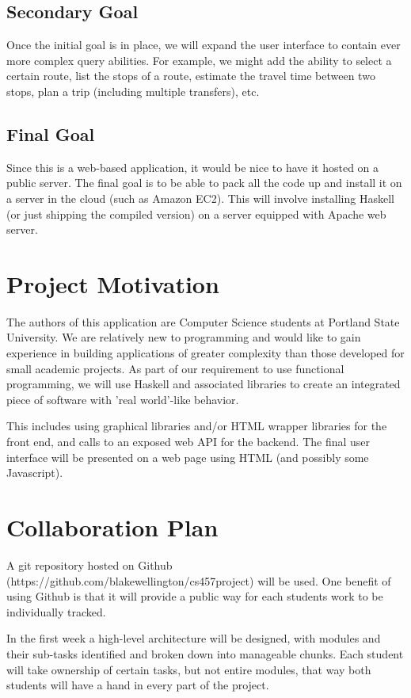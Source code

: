 \documentclass{article}
\begin{document}
\subsection*{Secondary Goal}
Once the initial goal is in place, we will expand the user interface to contain
ever more complex query abilities.  For example, we might add the ability to 
select a certain route, list the stops of a route, estimate the travel time
between two stops, plan a trip (including multiple transfers), etc.

\subsection*{Final Goal}
Since this is a web-based application, it would be nice to have it hosted on
a public server. The final goal is to be able to pack all the code up and 
install it on a server in the cloud (such as Amazon EC2). This will involve
installing Haskell (or just shipping the compiled version) on a server 
equipped with Apache web server.


\section*{Project Motivation} 
The authors of this application are Computer Science students at Portland
State University. We are relatively new to programming and would like to gain
experience in building applications of greater complexity than those developed
for small academic projects. As part of our requirement to use functional
programming, we will use Haskell and associated libraries to create an integrated 
piece of software with 'real world'-like behavior.

This includes using graphical libraries and/or HTML wrapper libraries for the 
front end, and calls to an exposed web API for the backend. The final user
interface will be presented on a web page using HTML (and possibly some Javascript).

\section*{Collaboration Plan}
A git repository hosted on Github (https://github.com/blakewellington/cs457project) 
will be used.  One benefit of using Github is that it will provide a public way
for each students work to be individually tracked.  

In the first week a high-level architecture will be designed, with modules and 
their sub-tasks identified and broken down into manageable chunks.  Each student
will take ownership of certain tasks, but not entire modules, that way both 
students will have a hand in every part of the project.  
\end{document}

